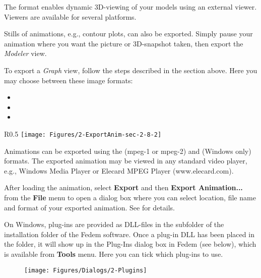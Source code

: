 The  format enables dynamic 3D-viewing of your models using
an external viewer. Viewers are available for several platforms.

Stills of animations, e.g., contour plots, can also be exported.
Simply pause your animation where you want the picture or 3D-snapshot taken,
then export the {\sl Modeler} view.



To export a {\sl Graph} view, follow the steps described in the section above.
Here you may choose between these image formats:

\begin{itemize}
\item{}
\item{}
\item{}
\end{itemize}



\begin{wrapfigure}{R}{0.5\textwidth}
  \texttt{[image: Figures/2-ExportAnim-sec-2-8-2]}
\end {wrapfigure}

Animations can be exported using the  (mpeg-1 or mpeg-2) and
 (Windows only) formats. The exported animation may be viewed
in any standard video player, e.g., Windows Media Player or Elecard MPEG
Player (www.elecard.com).

After loading the animation, select \textbf{Export} and then
\textbf{Export Animation...} from the \textbf{File} menu to open a dialog box
where you can select location, file name and format of your exported animation.
See  for details.

\clearpage



On Windows, plug-ins are provided as DLL-files in the  subfolder
of the installation folder of the Fedem software. Once a plug-in DLL has been
placed in the  folder, it will show up in the Plug-Ins dialog box
in Fedem (see below), which is available from \textbf{Tools} menu.
Here you can tick which plug-ins to use.

\begin{figure}[!h]
  \center\texttt{[image: Figures/Dialogs/2-Plugins]}
\end{figure}

